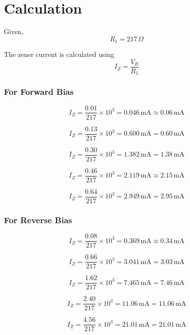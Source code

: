 \section{Calculation}

Given,
\[
  R_1 = 217\,\Omega
\]

The zener current is calculated using
\begin{equation}
  I_Z = \frac{V_R}{R_1}
\end{equation}

\subsubsection*{For Forward Bias}

\[
  I_Z = \frac{0.01}{217} \times 10^3 = 0.046\,\text{mA} \approx 0.06\,\text{mA}
\]

\[
  I_Z = \frac{0.13}{217} \times 10^3 = 0.600\,\text{mA} = \boxed{0.60\,\text{mA}}
\]

\[
  I_Z = \frac{0.30}{217} \times 10^3 = 1.382\,\text{mA} = \boxed{1.38\,\text{mA}}
\]

\[
  I_Z = \frac{0.46}{217} \times 10^3 = 2.119\,\text{mA} \approx 2.15\,\text{mA}
\]

\[
  I_Z = \frac{0.64}{217} \times 10^3 = 2.949\,\text{mA} = \boxed{2.95\,\text{mA}}
\]


\subsubsection*{For Reverse Bias}

\[
  I_Z = \frac{0.08}{217} \times 10^3 = 0.369\,\text{mA} \approx 0.34\,\text{mA}
\]

\[
  I_Z = \frac{0.66}{217} \times 10^3 = 3.041\,\text{mA} = \boxed{3.03\,\text{mA}}
\]

\[
  I_Z = \frac{1.62}{217} \times 10^3 = 7.465\,\text{mA} = \boxed{7.46\,\text{mA}}
\]

\[
  I_Z = \frac{2.40}{217} \times 10^3 = 11.06\,\text{mA} = \boxed{11.06\,\text{mA}}
\]

\[
  I_Z = \frac{4.56}{217} \times 10^3 = 21.01\,\text{mA} = \boxed{21.01\,\text{mA}}
\]

